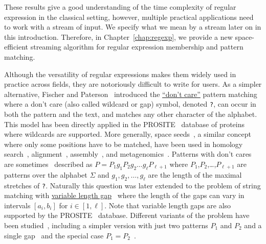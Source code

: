 These results give a good understanding of the time complexity of regular expression in the classical setting, however, multiple practical applications need to work with a stream of input. We specify what we mean by a stream later on in this introduction. Therefore, in Chapter~\ref{chap:regexp}, we provide a new space-efficient streaming algorithm for regular expression membership and pattern matching.


Although the versatility of regular expressions makes them widely used in practice across fields, they are notoriously difficult to write for users.
As a simpler alternative, Fischer and Paterson~\cite{fischer1974string} introduced the \underline{``don't care''} pattern matching where a don't care (also called wildcard or gap) symbol, denoted \texttt{?}, can occur in both the pattern and the text, and matches any other character of the alphabet.
This model has been directly applied in the PROSITE~\cite{hulo2006prosite} database of proteins where wildcards are supported. More generally, space seeds~\cite{li2004patternhunter}, a similar concept where only some positions have to be matched, have been used in homology search~\cite{ma2002patternhunter}, alignment~\cite{david2011shrimp2}, assembly~\cite{birol2015spaced}, and metagenomics~\cite{bvrinda2015spaced}.
Patterns with don't cares are sometimes~\cite{lewenstein2011indexing} described as $P= P_1g_1P_2g_2 \dots g_\ell P_{\ell+1}$ where $P_1$,$P_2$,\dots,$P_{\ell+1}$ are patterns over the alphabet $\Sigma$ and $g_1,g_2,\dots,g_{\ell}$ are the length of the maximal stretches of \texttt{?}. 
Naturally this question was later extended to the problem of string matching with \underline{variable length gap}~\cite{bille2012string,bille2014string} where the length of the gaps can vary in intervals $[a_i,b_i]$ for $i\in[1,\ell]$.
Note that variable length gaps are also supported by the PROSITE~\cite{hulo2006prosite} database.
Different variants of the problem have been studied~\cite{kopelowitz2016color,cohen2009range,brodal1999finding}, including a simpler version with just two patterns $P_1$ and $P_2$ and a single gap~\cite{peterlongo2006gapped,iliopoulos2009indexing} and the special case $P_1=P_2$~\cite{muthukrishnan2002efficient,keller2007range}.

